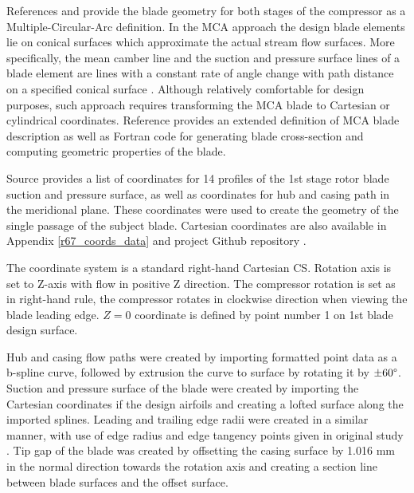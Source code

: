 References \citep{r67design} and \citep{r67performance} provide the blade geometry for both stages of the compressor as a Multiple-Circular-Arc definition. In the MCA approach the design blade elements lie on conical surfaces which approximate the actual stream flow surfaces. More specifically, the mean camber line and the suction and pressure surface lines of a blade element are lines with a constant rate of angle change with path distance on a specified conical surface \citep{bladecompose}. Although relatively comfortable for design purposes, such approach requires transforming the MCA blade to Cartesian or cylindrical coordinates. Reference \citep{bladecompose} provides an extended definition of MCA blade description as well as Fortran code for generating blade cross-section and computing geometric properties of the blade.

Source \citep{r67laser} provides a list of coordinates for 14 profiles of the 1st stage rotor blade suction and pressure surface, as well as coordinates for hub and casing path in the meridional plane. These coordinates were used to create the geometry of the single passage of the subject blade. Cartesian coordinates are also available in Appendix \ref{r67_coords_data} and project Github repository \citep{github}.

The coordinate system is a standard right-hand Cartesian CS. Rotation axis is set to Z-axis with flow in positive Z direction. The compressor rotation is set as in right-hand rule, the compressor rotates in clockwise direction when viewing the blade leading edge. $Z = 0$ coordinate is defined by point number 1 on 1st blade design surface.


Hub and casing flow paths were created by importing formatted point data as a \mbox{b-spline} curve, followed by extrusion the curve to surface by rotating it by $\pm 60 \degree$. Suction and pressure surface of the blade were created by importing the Cartesian coordinates if the design airfoils and creating a lofted surface along the imported splines. Leading and trailing edge radii were created in a similar manner, with use of edge radius and edge tangency points given in original study \citep{r67laser}. Tip gap of the blade was created by offsetting the casing surface by 1.016 mm in the normal direction towards the rotation axis and creating a section line between blade surfaces and the offset surface.

